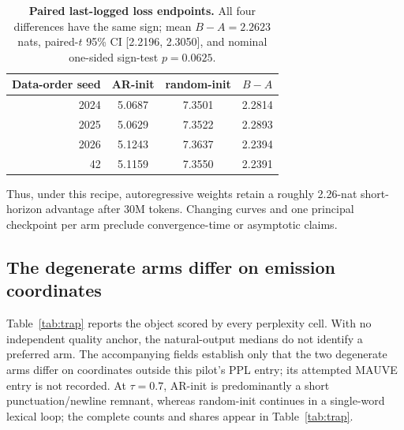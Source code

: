\documentclass{article}
\newcommand{\armA}{AR-init}
\newcommand{\armB}{random-init}
\begin{document}
\begin{table}[!t]
  \caption{\textbf{Paired last-logged loss endpoints.}  All four differences
  have the same sign; mean $B-A=2.2623$ nats, paired-$t$ 95\% CI
  [2.2196, 2.3050], and nominal one-sided sign-test $p=0.0625$.}
  \label{tab:seedendpoints}
  \centering
  \footnotesize
  \setlength{\tabcolsep}{4pt}
  \begin{tabular}{@{}rccc@{}}
    \toprule
    Data-order seed & \armA{} & \armB{} & $B-A$ \\
    \midrule
    2024 & 5.0687 & 7.3501 & 2.2814 \\
    2025 & 5.0629 & 7.3522 & 2.2893 \\
    2026 & 5.1243 & 7.3637 & 2.2394 \\
    42   & 5.1159 & 7.3550 & 2.2391 \\
    \bottomrule
  \end{tabular}
\end{table}

Thus, under this recipe, autoregressive weights retain a roughly 2.26-nat
short-horizon advantage after 30M tokens.  Changing curves and one principal
checkpoint per arm preclude convergence-time or asymptotic claims.

\subsection{The degenerate arms differ on emission coordinates}
\label{sec:ppltrap}

Table~\ref{tab:trap} reports the object scored by every perplexity cell.  With
no independent quality anchor, the natural-output medians do not identify a
preferred arm.  The accompanying fields establish only that the two degenerate
arms differ on coordinates outside this pilot's PPL entry; its attempted
MAUVE entry is not recorded.  At $\tau=0.7$, \armA{} is predominantly a short punctuation/newline remnant,
whereas \armB{} continues in a single-word lexical loop; the complete counts
and shares appear in Table~\ref{tab:trap}.
\end{document}
